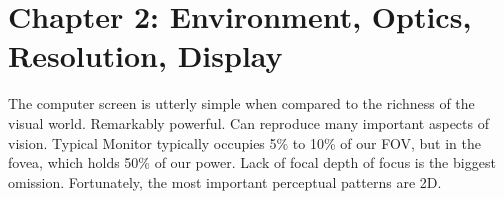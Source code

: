 \section{Chapter 2: Environment, Optics, Resolution, Display}

\graphicspath{ {pngs/ch2/} }



\secttoc

The computer screen is utterly simple when compared to the richness of the
visual world. Remarkably powerful. Can reproduce many important aspects of
vision. Typical Monitor typically occupies 5\% to 10\% of our FOV, but in the
fovea, which holds 50\% of our power.
Lack of focal depth of focus is the biggest omission. Fortunately,
the most important perceptual patterns are 2D.

\begin{mdframed}\begin{multicols}{2}

\end{multicols}
\end{mdframed}
